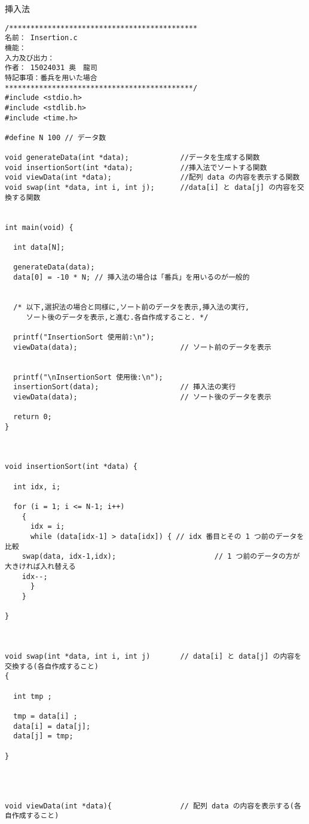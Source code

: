 \documentclass[a4j,titlepage]{jarticle}
\begin{document}
\begin{breakitembox}[l]{挿入法} \small
\begin{verbatim}
/********************************************
名前： Insertion.c 
機能： 
入力及び出力： 
作者： 15024031 奥　龍司
特記事項：番兵を用いた場合
********************************************/
#include <stdio.h>
#include <stdlib.h>
#include <time.h>

#define N 100 // データ数

void generateData(int *data);            //データを生成する関数
void insertionSort(int *data);           //挿入法でソートする関数
void viewData(int *data);                //配列 data の内容を表示する関数
void swap(int *data, int i, int j);      //data[i] と data[j] の内容を交換する関数


int main(void) {
  
  int data[N];
  
  generateData(data);
  data[0] = -10 * N; // 挿入法の場合は「番兵」を用いるのが一般的

  
  /* 以下,選択法の場合と同様に,ソート前のデータを表示,挿入法の実行,
     ソート後のデータを表示,と進む.各自作成すること. */

  printf("InsertionSort 使用前:\n");
  viewData(data);                        // ソート前のデータを表示
  

  printf("\nInsertionSort 使用後:\n");
  insertionSort(data);                   // 挿入法の実行
  viewData(data);                        // ソート後のデータを表示
  
  return 0;
}



void insertionSort(int *data) {
  
  int idx, i;

  for (i = 1; i <= N-1; i++)
    {
      idx = i;
      while (data[idx-1] > data[idx]) { // idx 番目とその 1 つ前のデータを比較
	swap(data, idx-1,idx);                       // 1 つ前のデータの方が大きければ入れ替える
	idx--;
      }
    }
  
}



void swap(int *data, int i, int j)       // data[i] と data[j] の内容を交換する(各自作成すること)
{

  int tmp ;

  tmp = data[i] ;
  data[i] = data[j];
  data[j] = tmp;
    
}




void viewData(int *data){                // 配列 data の内容を表示する(各自作成すること)


\end{verbatim}
\end{breakitembox}
\end{document}

